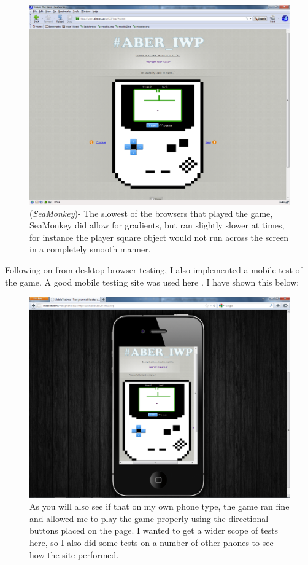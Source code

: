 \documentclass[a4paper]{article}
\begin{document}
 \begin{figure}[!ht]
   \centering
   \includegraphics[scale=0.4]{seamonkey.png}
  \caption{(\emph{SeaMonkey})- The slowest of the browsers that played the game,
SeaMonkey did allow for gradients, but ran slightly slower at times, for
instance the player square object would not run across the screen in a
completely smooth manner.  }
   \end{figure}
\clearpage
Following on from desktop browser testing, I also implemented a mobile test of
the game. A good mobile testing site was used here \cite{mobile}. I have shown
this below:\\
 \begin{figure}[!ht]
   \centering
   \includegraphics[scale=0.4]{iphone.png}
  \caption{As you will also see if that on my own phone type, the game ran fine
and allowed me to play the game properly using the directional buttons placed on
the page. I wanted to get a wider scope of tests here, so I also did some tests
on a number of other phones to see how the site performed.}
   \end{figure}
\end{document}
